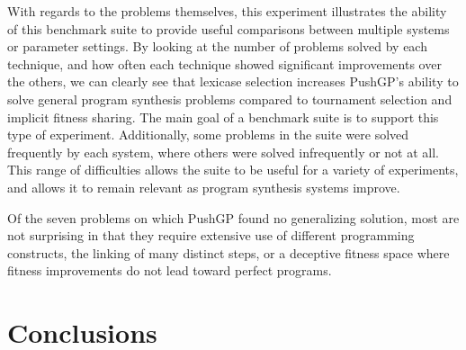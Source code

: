 \documentclass{sig-alternate}
\begin{document}
%

With regards to the problems themselves, this experiment illustrates the ability of this benchmark suite to provide useful comparisons between multiple systems or parameter settings. By looking at the number of problems solved by each technique, and how often each technique showed significant improvements over the others, we can clearly see that lexicase selection increases PushGP's ability to solve general program synthesis problems compared to tournament selection and implicit fitness sharing. The main goal of a benchmark suite is to support this type of experiment. Additionally, some problems in the suite were solved frequently by each system, where others were solved infrequently or not at all. This range of difficulties allows the suite to be useful for a variety of experiments, and allows it to remain relevant as program synthesis systems improve.

Of the seven problems on which PushGP found no generalizing solution, most are not surprising in that they require extensive use of different programming constructs, the linking of many distinct steps, or a deceptive fitness space where fitness improvements do not lead toward perfect programs. 







\section{Conclusions}
\end{document}
